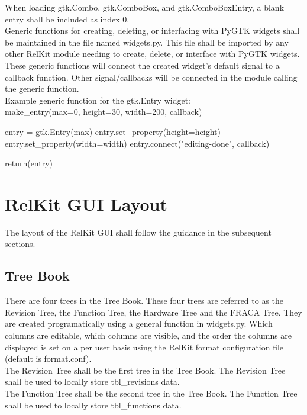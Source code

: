\documentclass[11pt, 12pt, twoside, onecolumn]{article}
\begin{document}
\noindent When loading gtk.Combo, gtk.ComboBox, and gtk.ComboBoxEntry, a blank entry shall be included as index 0. \\

\noindent Generic functions for creating, deleting, or interfacing with PyGTK widgets shall be maintained in the file named widgets.py.  This file shall be imported by any other RelKit module needing to create, delete, or interface with PyGTK widgets.  These generic functions will connect the created widget's default signal to a callback function.  Other signal/callbacks will be connected in the module calling the generic function. \\

\noindent Example generic function for the gtk.Entry widget: \\

        make\_entry(max=0, height=30, width=200, callback)

            entry = gtk.Entry(max)
            entry.set\_property(height=height)
            entry.set\_property(width=width)
            entry.connect("editing-done", callback)

            return(entry)

\section{\bf \Large RelKit GUI Layout}

\noindent The layout of the RelKit GUI shall follow the guidance in the subsequent sections.

\subsection{\bf \large Tree Book}

\noindent There are four trees in the Tree Book.  These four trees are referred to as the Revision Tree, the Function Tree, the Hardware Tree and the FRACA Tree.  They are created programatically using a general function in widgets.py.  Which columns are editable, which columns are visible, and the order the columns are displayed is set on a per user basis using the RelKit format configuration file (default is format.conf). \\

\noindent The Revision Tree shall be the first tree in the Tree Book.  The Revision Tree shall be used to locally store tbl\_revisions data. \\

\noindent The Function Tree shall be the second tree in the Tree Book.  The Function Tree shall be used to locally store tbl\_functions data. \\
\end{document}
